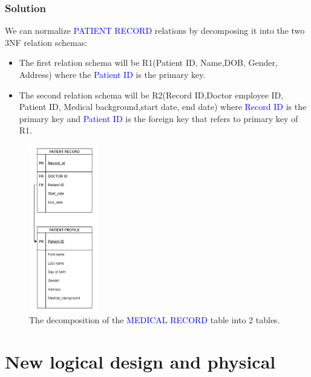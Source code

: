 \documentclass[a4paper]{article}
\numberwithin{equation}{section}
\begin{document}
\subsubsection{Solution}
We can normalize \textcolor{blue}{PATIENT RECORD} relations by decomposing it into the two 3NF relation schemas:
\begin{itemize}
  \item The first relation schema will be R1(Patient ID, Name,DOB, Gender, Address) where the \textcolor{blue}{Patient ID} is the primary key.
  \item The second relation schema will be R2(Record ID,Doctor employee ID, Patient ID, Medical background,start date, end date) where \textcolor{blue}{Record ID} is the primary key and \textcolor{blue}{Patient ID} is the foreign key that refers to primary key of R1.
\end{itemize}
\pagebreak
\begin{figure}[H]
  \centering
  \includegraphics[width = 3cm ]{assets/3NFsolution.PNG}
  \captionsetup{justification=centering,margin=2cm}
  \caption{The decomposition of the \textcolor{blue}{MEDICAL RECORD} table into 2 tables.}
\end{figure}

\section{New logical design and physical}
\end{document}
